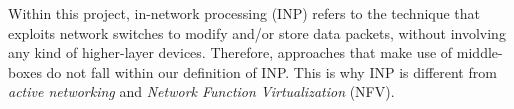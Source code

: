Within this project, in-network processing (INP) refers to the technique that exploits network switches to modify and/or store data packets, without involving any kind of higher-layer devices. Therefore, approaches that make use of middle-boxes do not fall within our definition of INP. This is why INP is different from \textit{active networking} and \textit{Network Function Virtualization} (NFV).